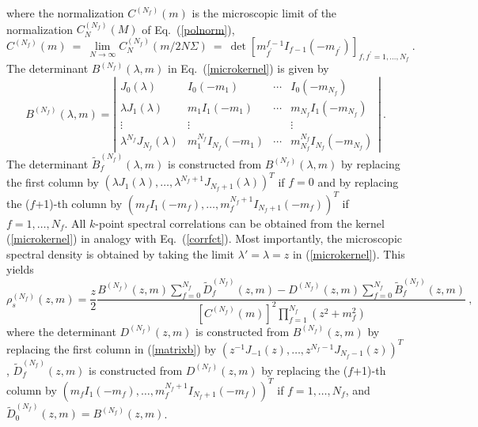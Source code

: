 where the normalization $C^{(N_f)}(m)$ is the microscopic limit
of the normalization $C_N^{(N_f)}(M)$ of Eq.~(\ref{polnorm}),
\begin{equation}
C^{(N_f)}(m) \ = \ \lim_{N\to\infty} C_N^{(N_f)}(m/2N\Sigma)
             \ = \ \det\left[m_{f^\prime}^{f-1}I_{f-1}(-m_{f^\prime})
                                 \right]_{f,f^\prime=1,\ldots,N_f} \ .
\label{CNfm}
\end{equation}
The determinant $B^{(N_f)}(\lambda,m)$ in Eq.~(\ref{microkernel}) is
given by
\begin{equation}
B^{(N_f)}(\lambda,m)=\left|
\begin{array}{cccc}
J_0(\lambda) & I_0(-m_1) & \cdots & I_0(-m_{N_f}) \\
\lambda J_1(\lambda) & m_1I_1(-m_1) & \cdots & m_{N_f}I_1(-m_{N_f}) \\
\vdots & \vdots & & \vdots \\
\lambda^{N_f}J_{N_f}(\lambda) & m_1^{N_f}I_{N_f}(-m_1) & \cdots &
m_{N_f}^{N_f}I_{N_f}(-m_{N_f}) \end{array} \right| \ .
\label{matrixb}
\end{equation}
The determinant $\widetilde{B}_f^{(N_f)}(\lambda,m)$ is constructed
from $B^{(N_f)}(\lambda,m)$ by replacing the first column by 
$(\lambda J_1(\lambda), \ldots,\lambda^{N_f+1}J_{N_f+1}(\lambda))^T$ 
if $f=0$ and by replacing the ($f$+1)-th column by
$(m_fI_1(-m_f),\ldots,m_f^{N_f+1}I_{N_f+1}(-m_f))^T$ if
$f=1,\ldots,N_f$.  All $k$-point spectral correlations can be obtained
from the kernel (\ref{microkernel}) in analogy with
Eq.~(\ref{corrfct}).  Most importantly, the microscopic spectral
density is obtained by taking the limit $\lambda'=\lambda=z$ in
(\ref{microkernel}).  This yields
\begin{equation}
  \label{microdens}
  \rho_s^{(N_f)}(z,m)=\frac{z}{2}
  \frac{B^{(N_f)}(z,m)\sum_{f=0}^{N_f}\widetilde{D}_f^{(N_f)}(z,m)
  -D^{(N_f)}(z,m)\sum_{f=0}^{N_f}\widetilde{B}_f^{(N_f)}(z,m)}
  {[C^{(N_f)}(m)]^2\prod_{f=1}^{N_f}(z^2+m_f^2)}\:,
\end{equation}
where the determinant $D^{(N_f)}(z,m)$ is constructed from
$B^{(N_f)}(z,m)$ by replacing the first column in (\ref{matrixb}) by
$(z^{-1}J_{-1}(z),\ldots, z^{N_f-1}J_{N_f-1}(z))^T$,
$\widetilde{D}_f^{(N_f)}(z,m)$ is constructed from $D^{(N_f)}(z,m)$ by
replacing the ($f$+1)-th column by
$(m_fI_1(-m_f),\ldots,m_f^{N_f+1}I_{N_f+1}(-m_f))^T$ if
$f=1,\ldots,N_f$, and $\widetilde{D}_0^{(N_f)}(z,m)=B^{(N_f)}(z,m)$.

